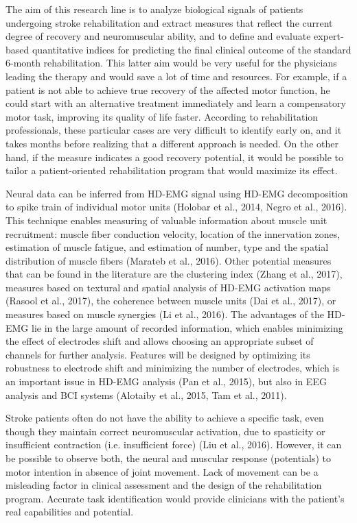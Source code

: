 The aim of this research line is to analyze biological signals of patients undergoing stroke rehabilitation and extract measures that reflect the current degree of recovery and neuromuscular ability, and to define and evaluate expert-based quantitative indices for
predicting the final clinical outcome of the standard 6-month rehabilitation. This latter aim would be very useful for the physicians leading the therapy and would save a lot of time and resources. For example, if a patient is not able to achieve true recovery of the affected motor function, he could start with an alternative treatment immediately and learn a compensatory motor task, improving its quality of life faster. According to rehabilitation professionals, these particular cases are very difficult to identify early on, and it takes months before realizing that a different approach is needed. On the other hand, if the measure indicates a good recovery potential, it would be possible to tailor a patient-oriented rehabilitation program that would maximize its effect.

Neural data can be inferred from HD-EMG signal using HD-EMG decomposition to spike train of individual motor units (Holobar et al., 2014, Negro et al., 2016). This technique enables measuring of valuable information about muscle unit recruitment: muscle fiber conduction velocity, location of the innervation zones, estimation of muscle fatigue, and estimation of number, type and the spatial distribution of muscle fibers (Marateb et al., 2016). Other potential measures that can be found in the literature are the clustering index (Zhang et al., 2017), measures based on textural and spatial analysis of HD-EMG activation maps (Rasool et al., 2017), the coherence between muscle units (Dai et al., 2017), or measures based on muscle synergies (Li et al., 2016). The advantages of the HD-EMG lie in the large amount of recorded information, which enables minimizing the effect of electrodes shift and allows choosing an appropriate subset of channels for further analysis. Features will be designed by optimizing its robustness to electrode shift and minimizing the number of electrodes, which is an important issue in HD-EMG analysis (Pan et al., 2015), but also in EEG analysis and BCI systems
(Alotaiby et al., 2015, Tam et al., 2011).

Stroke patients often do not have the ability to achieve a specific task, even though they maintain correct neuromuscular activation, due to spasticity or insufficient contraction (i.e. insufficient force) (Liu et al., 2016). However, it can be possible to observe both, the neural
and muscular response (potentials) to motor intention in absence of joint movement. Lack of movement can be a misleading factor in clinical assessment and the design of the rehabilitation program. Accurate task identification would provide clinicians with the patient’s real capabilities and potential.





